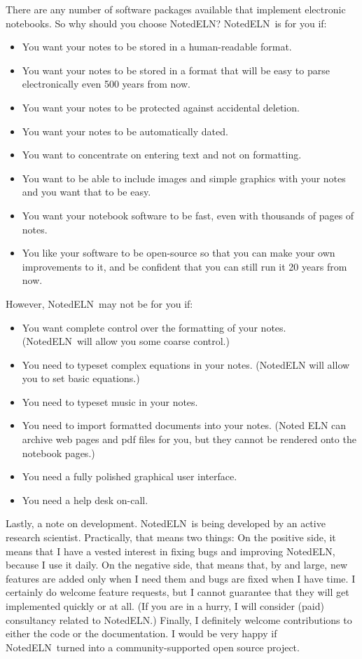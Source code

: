 \documentclass[11pt]{report}
\newcommand{\NotedELN}{NotedELN} %
\begin{document}
There are any
number of software packages available that implement electronic
notebooks. So why should you choose \NotedELN? \NotedELN\ is for you if:
\begin{itemize}
  \item You want your notes to be stored in a human-readable format.
  \item You want your notes to be stored in a format that will be easy to
    parse electronically even 500 years from now.
  \item You want your notes to be protected against accidental
    deletion.
  \item You want your notes to be automatically dated.
  \item You want to concentrate on entering text and not on
    formatting.
  \item You want to be able to include images and simple graphics with
    your notes and you want that to be easy.
  \item You want your notebook software to be fast, even with thousands
    of pages of notes.
  \item You like your software to be open-source so that you can make
    your own improvements to it, and be confident that you can still
    run it 20 years from now.
\end{itemize}

\noindent However, \NotedELN\ may not be for you if:
\begin{itemize}
  \item You want complete control over the formatting of your notes.
    (\NotedELN\ will allow you some coarse control.)
  \item You need to typeset complex equations in your notes. (\NotedELN
    will allow you to set basic equations.)
  \item You need to typeset music in your notes.
  \item You need to import formatted documents into your notes. (Noted
    ELN
    can archive web pages and pdf files for you, but they cannot be
    rendered onto the notebook pages.)
  \item You need a fully polished graphical user interface.
  \item You need a help desk on-call.
\end{itemize}
\noindent Lastly, a note on development. \NotedELN\ is being developed by an
active research scientist. Practically, that means two things: On the
positive side, it means that I have a vested interest in fixing bugs
and improving \NotedELN, because I use it daily. On the negative side, that
means that, by and large, new features are added only when I need them
and bugs are fixed when I have time. I certainly do welcome feature
requests, but I cannot guarantee that they will get implemented
quickly or at all. (If you are in a hurry, I will consider (paid)
consultancy related to \NotedELN.) Finally, I definitely welcome
contributions to either the code or the documentation. I would be very
happy if \NotedELN\ turned into a community-supported open source project.
\end{document}
